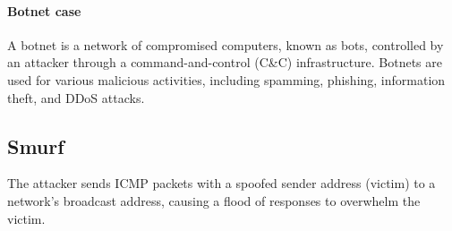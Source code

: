 \paragraph*{Botnet case}
A botnet is a network of compromised computers, known as bots, controlled by an attacker through a command-and-control (C&C) infrastructure. 
Botnets are used for various malicious activities, including spamming, phishing, information theft, and DDoS attacks.

\subsection{Smurf}
The attacker sends ICMP packets with a spoofed sender address (victim) to a network's broadcast address, causing a flood of responses to overwhelm the victim.
